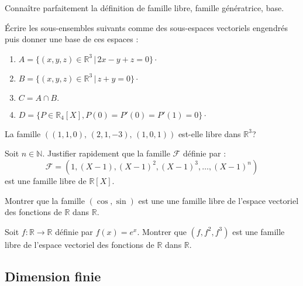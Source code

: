 \documentclass[a4paper,twoside,french,10pt]{VcCours}
\begin{document}
\begin{ptc}{}
	Connaître parfaitement la définition de famille libre, famille génératrice, base.
\end{ptc}


\medskip

\begin{Exercice}{}\end{Exercice} Écrire les sous-ensembles suivants comme des sous-espaces vectoriels engendrés puis donner une base de ces espaces :

\begin{enumerate}
\item $A=\lbrace (x,y,z) \in \mathbb{R}^3 \, \vert  \, 2x-y+z=0 \rbrace \cdot$
\item $B= \lbrace (x,y,z) \in \mathbb{R}^3 \, \vert \, z+y=0 \rbrace \cdot$
\item $C= A \cap B.$
\item $D = \lbrace P \in \mathbb{R}_4[X], P(0)=P'(0)=P'(1)=0 \rbrace \cdot$
\end{enumerate}

\medskip

\begin{Exercice}{}\end{Exercice} La famille $((1,1,0), \, (2,1,-3), \, (1,0,1))$ est-elle libre dans $\mathbb{R}^3$?

\medskip

\begin{Exercice}{}\end{Exercice} Soit $n \in \mathbb{N}$. Justifier rapidement que la famille $\mathcal{F}$ définie par :
$$ \mathcal{F} = (1, (X-1), (X-1)^2, (X-1)^3, \ldots, (X-1)^n)$$
est une famille libre de $\mathbb{R}[X]$.

\medskip

\begin{Exercice}{}\end{Exercice} Montrer que la famille $(\cos, \sin)$ est une une famille libre de l'espace vectoriel des fonctions de $\mathbb{R}$ dans $\mathbb{R}$.

\medskip

\begin{Exercice}{}\end{Exercice} Soit $f : \mathbb{R} \rightarrow \mathbb{R}$ définie par $f(x)=e^x$. Montrer que $(f,f^2,f^3)$ est une famille libre de l'espace vectoriel des fonctions de $\mathbb{R}$ dans $\mathbb{R}$.

\medskip

\subsection{Dimension finie}
\end{document}
